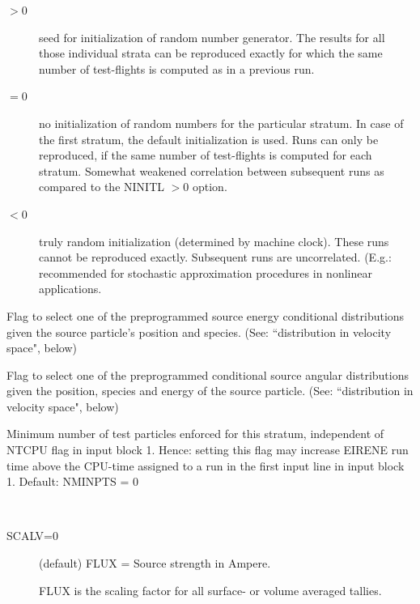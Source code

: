\begin{description}
        \begin{description}
          \item[$> 0$] seed for initialization of random number
                generator.
                The results for all those individual strata can be reproduced exactly for which
                the same number of test-flights is computed as in a previous run.
          \item[$= 0$] no initialization of random numbers for the particular stratum.
                In case of the first stratum, the default initialization is used.
                Runs can only be reproduced, if the same number of test-flights is computed for
                each stratum.
                Somewhat weakened correlation between subsequent runs as compared to the NINITL
                $> 0$ option.
          \item[$< 0$] truly random initialization (determined by machine clock).
                These runs cannot be reproduced exactly.
                Subsequent runs are uncorrelated.
                (E.g.: recommended for stochastic approximation procedures in nonlinear
                applications.
        \end{description}
  \item[NEMODS] Flag to select one of the preprogrammed source energy conditional
        distributions given the source particle's position and species.
        (See: ``distribution in velocity space", below)
  \item[NAMODS] Flag to select
        one of the preprogrammed conditional source angular distributions given the
        position, species and energy of the source particle.
        (See: ``distribution in velocity space", below) 

  \item[NMINPTS] Minimum number of test particles enforced for this stratum,
        independent of NTCPU flag in input block 1.
        Hence: setting this flag may increase EIRENE run time above the CPU-time
        assigned to a run in the first input line in input block 1.
        Default: NMINPTS = 0 

  \item[FLUX, SCALV]~ 

        \begin{description}
          \item[SCALV=0] (default) FLUX = Source strength in Ampere.

                FLUX is the scaling factor for all surface- or volume averaged tallies.


\end{description}
\end{description}
